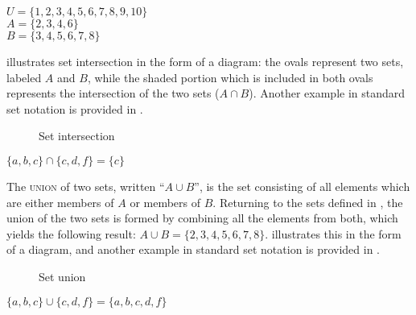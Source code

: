 \ea \label{ex:13.14}
$U = \{1,2,3,4,5,6,7,8,9,10\}$\\
$A = \{2,3,4,6\}$\\
$B = \{3,4,5,6,7,8\}$
\z


 illustrates set intersection in the form of a diagram: the ovals represent two sets, labeled $A$ and $B$, while the shaded portion which is included in both ovals represents the intersection of the two sets ($A\cap B$). Another example in standard set notation is provided in .

\begin{figure}
 


\caption{\label{fig:13:2} Set intersection}
\end{figure}

\ea \label{ex:13.15}
$\{a,b,c\} \cap \{c,d,f\} = \{c\}$
\z


The \textsc{union} of two sets, written “$A\cup B$”, is the set consisting of all elements which are either members of $A$ or members of $B$. Returning to the sets defined in , the union of the two sets is formed by combining all the elements from both, which yields the following result: $A\cup B = \{2,3,4,5,6,7,8\}$.  illustrates this in the form of a diagram, and another example in standard set notation is provided in .


\begin{figure}

\caption{\label{fig:13:3} Set union}
\end{figure}

\ea \label{ex:13.16}
$\{a,b,c\} \cup \{c,d,f\} = \{a,b,c,d,f\}$
\z


